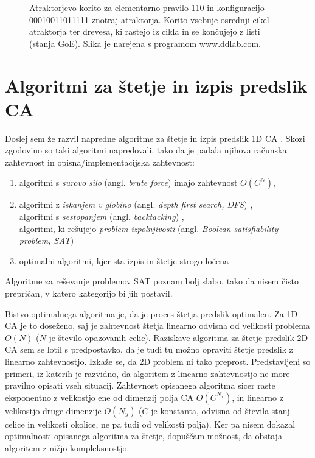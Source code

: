 \documentclass[12pt,a4paper,openany,twoside]{book}
\begin{document}
\begin{figure}[htb]
\centerline{}
\caption[Atraktorjevo korito.]
{Atraktorjevo korito za elementarno pravilo 110 in konfiguracijo 00010011011111 znotraj atraktorja.
Korito vsebuje osrednji cikel atraktorja ter drevesa, ki rastejo iz cikla in se končujejo z listi (stanja GoE).
Slika je narejena s programom \url{www.ddlab.com}.}
\label{basin_of_attraction}
\end{figure}

\section{Algoritmi za štetje in izpis predslik CA}

Doslej sem že razvil napredne algoritme za štetje in izpis predslik 1D CA \cite{JerasDobnikar2007}.
Skozi zgodovino so taki algoritmi napredovali, tako da je padala njihova
računska zahtevnost in opisna/implementacijska zahtevnost:
\begin{enumerate}
 \item algoritmi s \emph{surovo silo} (angl. \emph{brute force}) \cite{WikiBruteForce} imajo zahtevnost \( O(C^N) \),
 \item algoritmi z \emph{iskanjem v globino} (angl. \emph{depth first search, DFS}) \cite{WikiDFS}, \\
       algoritmi s \emph{sestopanjem} (angl. \emph{backtacking}) \cite{WikiBacktracking}, \\
       algoritmi, ki rešujejo \emph{problem izpolnjivosti} (angl. \emph{Boolean satisfiability problem, SAT}) \cite{WikiSAT}
 \item optimalni algoritmi, kjer sta izpis in štetje strogo ločena
\end{enumerate}
Algoritme za reševanje problemov SAT poznam bolj slabo,
tako da nisem čisto prepričan, v katero kategorijo bi jih postavil.

Bistvo optimalnega algoritma je, da je proces štetja predslik optimalen.
Za 1D CA je to doseženo, saj je zahtevnost štetja
linearno odvisna od velikosti problema \(O(N)\) (\(N\) je število opazovanih celic). 
Raziskave algoritma za štetje predslik 2D CA sem se lotil s predpostavko,
da je tudi tu možno opraviti štetje predslik z linearno zahtevnostjo.
Izkaže se, da 2D problem ni tako preprost.
Predstavljeni so primeri, iz katerih je razvidno,
da algoritem z linearno zahtevnostjo ne more pravilno opisati vseh situacij.
Zahtevnost opisanega algoritma sicer raste eksponentno z velikostjo ene
od dimenzij polja CA \( O(C^{N_x}) \), in linearno z velikostjo druge dimenzije \( O(N_y) \)
(\(C\) je konstanta, odvisna od števila stanj celice in velikosti okolice, ne pa tudi od velikosti polja).
Ker pa nisem dokazal optimalnosti opisanega algoritma za štetje,
dopuščam možnost, da obstaja algoritem z nižjo kompleksnostjo.
\end{document}
